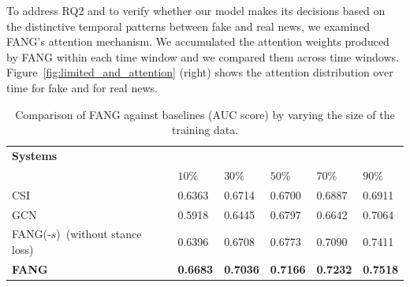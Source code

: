 \documentclass[sigconf]{acmart}
\theoremstyle{definition}
\theoremstyle{hypothesis}
\begin{document}
To address RQ2 and to verify whether our model makes its decisions based on the distinctive temporal patterns between fake and real news, we examined FANG's attention mechanism. We accumulated the attention weights produced by FANG within each time window and we compared them across time windows. Figure~\ref{fig:limited_and_attention} (right) shows the attention distribution over time for fake and for real news. 
\begin{table}[t]
    \centering
    \small
    \caption{Comparison of FANG against baselines (AUC score) by varying the size of the training data.}
    \begin{tabular}{l  l l l l l} 
    \toprule
        \bf Systems & \multicolumn{5}{c}{\centering{\bf AUC score at different training percentages}} \\
         & \bf $10\%$ & \bf $30\%$ & \bf $50\%$ & \bf $70\%$ & \bf $90\%$ \\
    \midrule
        CSI & 0.6363  & 0.6714  & 0.6700 & 0.6887 & 0.6911 \\
        GCN & 0.5918 & 0.6445  & 0.6797 & 0.6642 & 0.7064 \\
        FANG(-$s$)~\tiny{(without stance loss)} & 0.6396 & 0.6708 & 0.6773 & 0.7090 & 0.7411 \\ \hline
         \textbf{FANG} &  \textbf{0.6683} &  \textbf{0.7036} &  \textbf{0.7166} &  \textbf{0.7232} &  \textbf{0.7518} \\ 
    \bottomrule
    \end{tabular}
    \label{table:limited_data}
\end{table}
\end{document}
